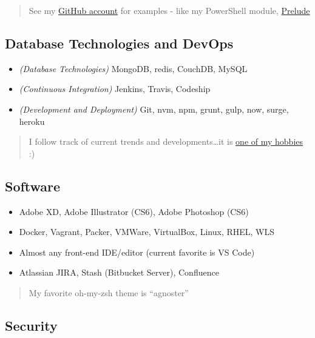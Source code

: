 \documentclass[10pt]{article}
\def\tightlist{}
\begin{document}
\begin{quote}
See my \href{https://github.com/jhwohlgemuth}{GitHub account} for
examples - like my PowerShell module,
\href{https://github.com/jhwohlgemuth/pwsh-prelude}{Prelude}
\end{quote}

\hypertarget{database-technologies-and-devops}{%
\subsection{Database Technologies and
DevOps}\label{database-technologies-and-devops}}

\begin{itemize}
\tightlist
\item
  \emph{(Database Technologies)} MongoDB, redis, CouchDB, MySQL
\item
  \emph{(Continuous Integration)} Jenkins, Travis, Codeship
\item
  \emph{(Development and Deployment)} Git, nvm, npm, grunt, gulp, now,
  surge, heroku
\end{itemize}

\begin{quote}
I follow track of current trends and developments\ldots{}it is
\href{https://twitter.com/jhwohlgemuth}{one of my hobbies} :)
\end{quote}

\hypertarget{software}{%
\subsection{Software}\label{software}}

\begin{itemize}
\tightlist
\item
  Adobe XD, Adobe Illustrator (CS6), Adobe Photoshop (CS6)
\item
  Docker, Vagrant, Packer, VMWare, VirtualBox, Linux, RHEL, WLS
\item
  Almost any front-end IDE/editor (current favorite is VS Code)
\item
  Atlassian JIRA, Stash (Bitbucket Server), Confluence
\end{itemize}

\begin{quote}
My favorite oh-my-zsh theme is ``agnoster''
\end{quote}

\hypertarget{security}{%
\subsection{Security}\label{security}}
\end{document}
